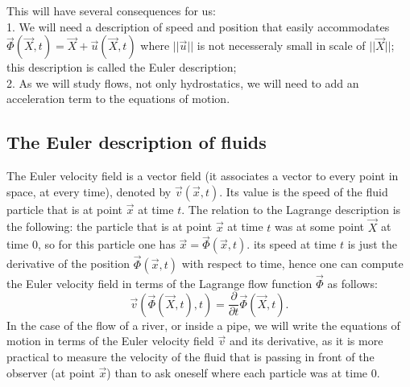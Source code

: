\documentclass[DIV=12]{article}
\begin{document}
This will have several consequences for us:\\
1. We will need a description of speed and position that easily accommodates $\vec{\Phi}(\vec{X}, t ) = \vec{X} + \vec{u}( \vec{X}, t )$
where $|| \vec{u }||$ is not necesseraly small in scale of $||\vec{X}||$; this description is called the Euler description;\\
2. As we will study flows, not only hydrostatics, we will need to add an acceleration term to the equations of motion.\\   


\subsection{The Euler description of fluids}

The Euler velocity field is a vector field (it associates 
 a vector to every point in space, at every time), denoted by $\vec{v}( \vec{x}, t )$.
Its value is the speed of the fluid particle that is at point $\vec{x}$ at time $t$. The relation to 
 the Lagrange description is the following: the particle that is at point $\vec{x}$ at time $t$
 was at some point $\vec{X}$ at time $0$, so for this particle one has $\vec{x} = \vec{\Phi}( \vec{x}, t  )$.
 its speed at time $t$ is just the derivative of the position $\vec{\Phi}( \vec{x}, t  )$ with respect to time, hence
 one can compute the Euler velocity field in terms of the Lagrange flow function $\vec{\Phi}$ as follows:
\[
\boxed{
\vec{v}( \vec{\Phi}(\vec{X}, t),t) = \frac{\partial}{\partial t}\vec{\Phi}(\vec{X}, t ).
}
\label{equivalence}
\]
In the case of the flow of a river, or inside a pipe, we will write the equations
of motion in terms of the Euler velocity field $\vec{v}$ and its derivative, 
 as it is more practical to measure the velocity of the fluid that is passing 
 in front of the observer (at point $\vec{x}$) than to ask oneself where each particle was
 at time $0$.\\
\end{document}
